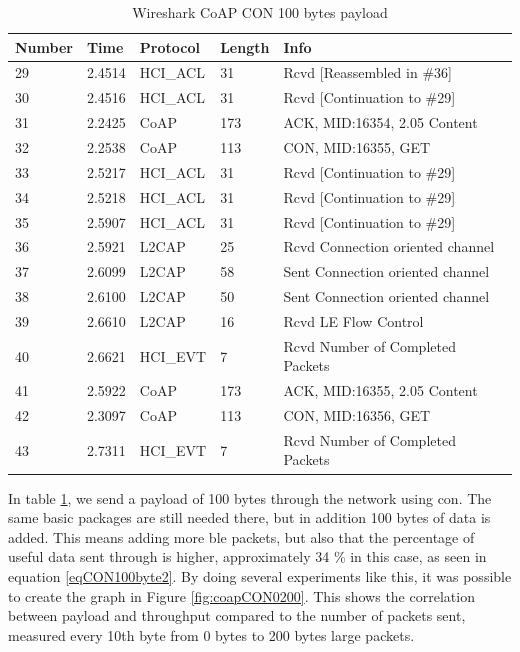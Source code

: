 \begin{table}[H]
\centering
\caption{Wireshark CoAP CON 100 bytes payload}
\label{coapCON100table}
\begin{tabular}{lllll}
Number & Time   & Protocol & Length & Info                             \\ \hline
29     & 2.4514 & HCI\_ACL & 31     & Rcvd {[}Reassembled in \#36{]}   \\
30     & 2.4516 & HCI\_ACL & 31     & Rcvd {[}Continuation to \#29{]}  \\
31     & 2.2425 & CoAP     & 173    & ACK, MID:16354, 2.05 Content     \\
32     & 2.2538 & CoAP     & 113    & CON, MID:16355, GET              \\
33     & 2.5217 & HCI\_ACL & 31     & Rcvd {[}Continuation to \#29{]}  \\
34     & 2.5218 & HCI\_ACL & 31     & Rcvd {[}Continuation to \#29{]}  \\
35     & 2.5907 & HCI\_ACL & 31     & Rcvd {[}Continuation to \#29{]}  \\
36     & 2.5921 & L2CAP    & 25     & Rcvd Connection oriented channel \\
37     & 2.6099 & L2CAP    & 58     & Sent Connection oriented channel \\
38     & 2.6100 & L2CAP    & 50     & Sent Connection oriented channel \\
39     & 2.6610 & L2CAP    & 16     & Rcvd LE Flow Control             \\
40     & 2.6621 & HCI\_EVT & 7      & Rcvd Number of Completed Packets \\
41     & 2.5922 & CoAP     & 173    & ACK, MID:16355, 2.05 Content     \\
42     & 2.3097 & CoAP     & 113    & CON, MID:16356, GET              \\ 
43     & 2.7311 & HCI\_EVT & 7      & Rcvd Number of Completed Packets \\ \hline
\end{tabular}
\end{table}

\noindent In table \ref{coapCON100table}, we send a \gls{payload} of 100 bytes through the network using \gls{con}. The same basic packages are still needed there, but in addition 100 bytes of data is added. This means adding more \gls{ble} packets, but also that the percentage of useful data sent through is  higher, approximately 34 \% in this case, as seen in equation \ref{eqCON100byte2}. By doing several experiments like this, it was possible to create the graph in Figure \ref{fig:coapCON0200}. This shows the correlation between \gls{payload} and \gls{throughput} compared to the number of packets sent, measured every 10th byte from 0 \glspl{byte} to 200 \glspl{byte} large packets. %

